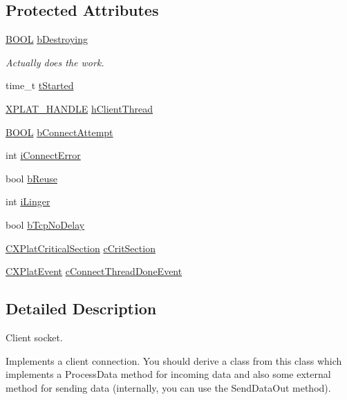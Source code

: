 \subsection*{\-Protected \-Attributes}
\begin{DoxyCompactItemize}
\item 
\hyperlink{_cpclient_8h_a3be13892ae7076009afcf121347dd319}{\-B\-O\-O\-L} \hyperlink{class_c_client_socket_added75c4c526045e911bbc732f7d3d25}{b\-Destroying}
\begin{DoxyCompactList}\small\item\em \-Actually does the work. \end{DoxyCompactList}\item 
time\-\_\-t \hyperlink{class_c_client_socket_a64622c72994fb5bcacb0f9e1adf3f080}{t\-Started}
\item 
\hyperlink{_x_plat_8h_af3c5c1485bb09f4be888d78cdaf93e00}{\-X\-P\-L\-A\-T\-\_\-\-H\-A\-N\-D\-L\-E} \hyperlink{class_c_client_socket_a6ce77be76b474ae73e419ea9c89c0b77}{h\-Client\-Thread}
\item 
\hyperlink{_cpclient_8h_a3be13892ae7076009afcf121347dd319}{\-B\-O\-O\-L} \hyperlink{class_c_client_socket_a4d9d11fa1ce3dd3eff8bf0f03afe01ef}{b\-Connect\-Attempt}
\item 
int \hyperlink{class_c_client_socket_a09188be04cc0f1d2c2efa06cd69d8aa1}{i\-Connect\-Error}
\item 
bool \hyperlink{class_c_client_socket_a637cd103e13587df34c0d1937e95aefa}{b\-Reuse}
\item 
int \hyperlink{class_c_client_socket_af33729182418c1e9868ad0fed1a68a1e}{i\-Linger}
\item 
bool \hyperlink{class_c_client_socket_a0b7201c5883116b700d19bcfc61e49c5}{b\-Tcp\-No\-Delay}
\item 
\hyperlink{class_c_x_plat_critical_section}{\-C\-X\-Plat\-Critical\-Section} \hyperlink{class_c_client_socket_a9bb4b1a7b04a8acc551d156c76a6c5ed}{c\-Crit\-Section}
\item 
\hyperlink{class_c_x_plat_event}{\-C\-X\-Plat\-Event} \hyperlink{class_c_client_socket_a9e119c8e8534aac4d7686469429e14b9}{c\-Connect\-Thread\-Done\-Event}
\end{DoxyCompactItemize}


\subsection{\-Detailed \-Description}
\-Client socket. 

\-Implements a client connection. \-You should derive a class from this class which implements a \-Process\-Data method for incoming data and also some external method for sending data (internally, you can use the \-Send\-Data\-Out method). 

